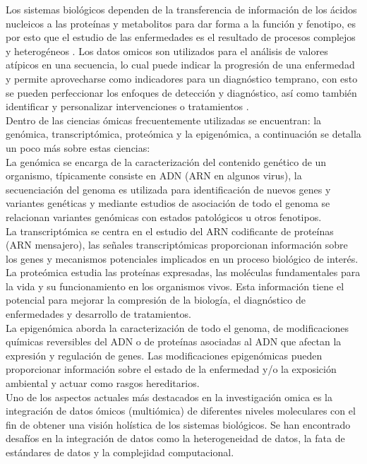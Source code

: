Los sistemas biológicos dependen de la transferencia de información de los ácidos nucleicos a las proteínas y metabolitos para dar forma a la función y fenotipo, es por esto que el estudio de las enfermedades es el resultado de procesos complejos y heterogéneos \citep{kim2018data}. Los datos omicos son utilizados para el análisis de valores atípicos en una secuencia, lo cual puede indicar la progresión de una enfermedad y permite aprovecharse como indicadores para un diagnóstico temprano, con esto se pueden perfeccionar los enfoques de detección y diagnóstico, así como también identificar y personalizar intervenciones o tratamientos \citep{krassowski2020state}.\\

Dentro de las ciencias ómicas frecuentemente utilizadas se encuentran: la genómica, transcriptómica, proteómica y la epigenómica, a continuación se detalla un poco más sobre estas ciencias:\\

La genómica se encarga de la caracterización del contenido genético de un organismo, típicamente consiste en ADN (ARN en algunos virus), la secuenciación del genoma es utilizada para identificación de nuevos genes y variantes genéticas y mediante estudios de asociación de todo el genoma se relacionan variantes genómicas con estados patológicos u otros fenotipos.\\

La transcriptómica se centra en el estudio del ARN codificante de proteínas (ARN mensajero), las señales transcriptómicas proporcionan información sobre los genes y mecanismos potenciales implicados en un proceso biológico de interés.\\

La proteómica estudia las proteínas expresadas, las moléculas fundamentales para la vida y su funcionamiento en los organismos vivos. Esta información tiene el potencial para mejorar la compresión de la biología, el diagnóstico de enfermedades y desarrollo de tratamientos.\\

La epigenómica aborda la caracterización de todo el genoma, de modificaciones químicas reversibles del ADN o de proteínas asociadas al ADN que afectan la expresión y regulación de genes. Las modificaciones epigenómicas pueden proporcionar información sobre el estado de la enfermedad y/o la exposición ambiental y actuar como rasgos hereditarios.\\

Uno de los aspectos actuales más destacados en la investigación omica es la integración de datos ómicos (multiómica) de diferentes niveles moleculares con el fin de obtener una visión holística de los sistemas biológicos. Se han encontrado desafíos en la integración de datos como la heterogeneidad de datos, la fata de estándares de datos y la complejidad computacional.

